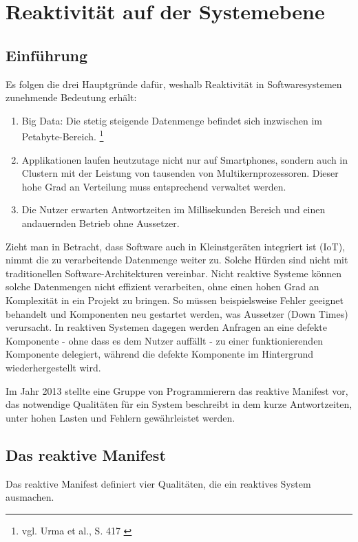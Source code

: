 \chapter{Reaktivität auf der Systemebene}
\label{chap:reaktivitaet_auf_der_systemebene}
\section{Einführung}
Es folgen die drei Hauptgründe dafür, weshalb Reaktivität in Softwaresystemen zunehmende Bedeutung erhält:
\begin{enumerate}
\item Big Data: Die stetig steigende Datenmenge befindet sich inzwischen im Petabyte-Bereich. \footnote{vgl. Urma et al., S. 417 \cite{buch:modern_java_in_action:kapitel17} \label{modernjavainaction:chap17}}
\item Applikationen laufen heutzutage nicht nur auf Smartphones, sondern auch in Clustern mit der Leistung von tausenden von Multikernprozessoren. Dieser hohe Grad an Verteilung muss entsprechend verwaltet werden. 
\item Die Nutzer erwarten Antwortzeiten im Millisekunden Bereich und einen andauernden Betrieb ohne Aussetzer. 
\end{enumerate}

Zieht man in Betracht, dass Software auch in Kleinstgeräten integriert ist (IoT), nimmt die zu verarbeitende Datenmenge weiter zu.  Solche Hürden sind nicht mit traditionellen Software-Architekturen vereinbar. Nicht reaktive Systeme können solche Datenmengen nicht effizient verarbeiten, ohne einen hohen Grad an Komplexität in ein Projekt zu bringen. So müssen beispielsweise Fehler geeignet behandelt und Komponenten neu gestartet werden, was Aussetzer (Down Times) verursacht. In reaktiven Systemen dagegen werden Anfragen an eine defekte Komponente - ohne dass es dem Nutzer auffällt - zu einer funktionierenden Komponente delegiert, während die defekte Komponente im Hintergrund wiederhergestellt wird.
 
Im Jahr 2013 stellte eine Gruppe von Programmierern das reaktive Manifest vor, das notwendige Qualitäten für ein System beschreibt in dem kurze Antwortzeiten, unter hohen Lasten und Fehlern gewährleistet werden.
\section{Das reaktive Manifest}
\label{sec:das_reaktive_manfiest}
Das reaktive Manifest definiert vier Qualitäten, die ein reaktives System ausmachen.

